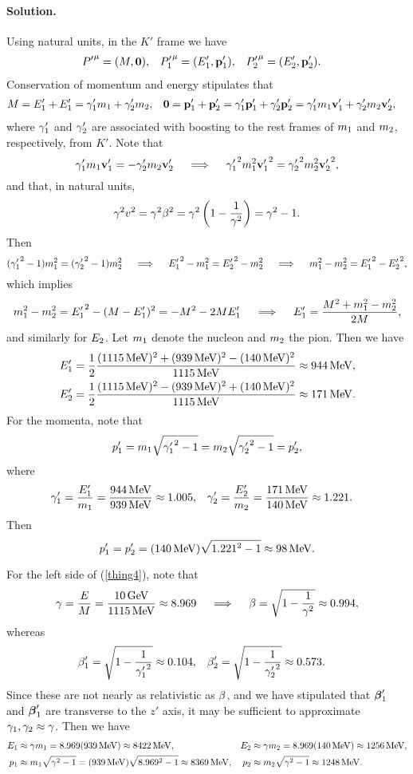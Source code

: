 \documentclass[11pt]{article}
\newcommand{\qimplies}{\quad\implies\quad}
\newcommand{\refeq}[1]{(\ref{#1})}
\newcommand{\beq}{\begin{equation*}}
\newcommand{\eeq}{\end{equation*}}
\newenvironment{solution}
{
	\paragraph{Solution.}
	\ignorespaces
}
{
    \bigskip
}
\begin{document}
\begin{solution}
	Using natural units, in the $K'$ frame we have
	\begin{align*}
		{P'}^\mu &= (M, \mathbf{0}), &
		{P_1'}^\mu &= (E_1', \vb{p}_1'), &
		{P_2'}^\mu &= (E_2', \vb{p}_2').
	\end{align*}
	Conservation of momentum and energy stipulates that
	\begin{align*}
		M &= E_1' + E_1'
		= \gamma_1' m_1 + \gamma_2' m_2, &
		\mathbf{0} &= \vb{p}_1' + \vb{p}_2'
		= \gamma_1' \vb{p}_1' + \gamma_2' \vb{p}_2'
		= \gamma_1' m_1 \vb{v}_1' + \gamma_2' m_2 \vb{v}_2',
	\end{align*}
	where $\gamma_1'$ and $\gamma_2'$ are associated with boosting to the rest frames of $m_1$ and $m_2$, respectively, from $K'$.  Note that
	\beq
		\gamq' \mq \vvq' = -\gamw' \mw \vvw'
		\qimplies
		{\gamq'}^2 \mq^2 {\vvq'}^2 = {\gamw'}^2 \mw^2 {\vvw'}^2,
	\eeq
	and that, in natural units,
	\beq
		\gam^2 v^2 = \gam^2 \bet^2
		= \gam^2 \left( 1 - \frac{1}{\gam^2} \right)
		= \gam^2 - 1.
	\eeq
	Then
	\beq
		({\gamq'}^2 - 1) \mq^2 = ({\gamw'}^2 - 1) \mw^2
		\qimplies
		{\Eq'}^2 - \mq^2 = {\Ew'}^2 - \mw^2
		\qimplies
		\mq^2 - \mw^2 = {\Eq'}^2 - {\Ew'}^2,
	\eeq
	which implies
	\beq
		\mq^2 - \mw^2 = {\Eq'}^2 - (M - \Eq')^2 = -M^2 - 2 M \Eq'
		\qimplies
		\Eq' = \frac{M^2 + \mq^2 - \mw^2}{2 M},
	\eeq
	and similarly for $E_2$.  Let $m_1$ denote the nucleon and $m_2$ the pion.  Then we have
	\begin{align*}
		\Eq' &= \frac{1}{2} \frac{(\mLam)^2 + (\mnuc)^2 - (\mpi)^2}{\mLam} 
		\approx \Enucp, \\
		\Ew' &= \frac{1}{2} \frac{(\mLam)^2 - (\mnuc)^2 + (\mpi)^2}{\mLam} 
		\approx \Epip.
	\end{align*}
	For the momenta, note that
	\beq
		\pq' = \mq \sqrt{{\gamq'}^2 - 1}
		= \mw \sqrt{{\gamw'}^2 - 1}
		= \pw',
	\eeq
	where
	\begin{align*}
		\gamq' &= \frac{\Eq'}{\mq}
		= \frac{\Enucp}{\mnuc}
		\approx \gamnuc, &
		\gamw' &= \frac{\Ew'}{\mw}
		= \frac{\Epip}{\mpi}
		\approx \gampi.
	\end{align*}
	Then
	\beq
		\pq' = \pw' = (\mpi) \sqrt{{\gampi}^2 - 1}
		\approx \pnucp.
	\eeq
	
	For the left side of \refeq{thing4}, note that
	\beq
		\gam = \frac{E}{M}
		= \frac{\ELam}{\mLam}
		\approx \gamLam
		\qimplies
		\bet = \sqrt{1 - \frac{1}{\gam^2}}
		\approx 0.994,
	\eeq
	whereas
	\begin{align*}
		\beta_1' &= \sqrt{1 - \frac{1}{{\gamma_1'}^2}}
		\approx 0.104, &
		\beta_2' &= \sqrt{1 - \frac{1}{{\gamma_2'}^2}}
		\approx 0.573. &
	\end{align*}
	Since these are not nearly as relativistic as $\beta$, and we have stipulated that $\boldsymbol{\beta}'_1$ and $\boldsymbol{\beta}'_1$ are transverse to the $z'$ axis, it may be sufficient to approximate $\gamma_1, \gamma_2 \approx \gamma$.  Then we have
	\begin{align*}
		\Eq &\approx \gam \mq
		= \gamLam (\mnuc)
		\approx \Enuc, &
		\Ew &\approx \gam \mw
		= \gamLam (\mpi)
		\approx \Epi, \\
		\pq &\approx \mq \sqrt{\gam^2 - 1}
		= (\mnuc) \sqrt{\gamLam^2 - 1}
		\approx \pnuc, &
		\pw &\approx \mw \sqrt{\gam^2 - 1}
		\approx \ppi.
	\end{align*}
	

\end{solution}
\end{document}
